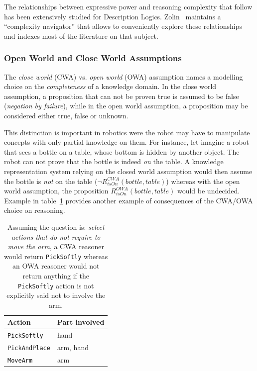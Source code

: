 \documentclass[a4paper, twocolumn]{article}
\begin{document}
The relationships between expressive power and reasoning complexity that follow
has been extensively studied for Description Logics.
Zolin~\cite{ZolinDLComplexityNavigator} maintains a ``complexity navigator''
that allows to conveniently explore these relationships and indexes most of the
literature on that subject.

\subsubsection{Open World and Close World Assumptions}

The \emph{close world} (CWA) vs. \emph{open world} (OWA) assumption names a
modelling choice on the \emph{completeness} of a knowledge domain. In the close
world assumption, a proposition that can not be proven true is assumed to be
false (\emph{negation by failure}), while in the open world assumption, a
proposition may be considered either true, false or unknown.

This distinction is important in robotics were the robot may have to manipulate
concepts with only partial knowledge on them. For instance, let imagine a robot
that sees a bottle on a table, whose bottom is hidden by another object. The
robot can not prove that the bottle is indeed \emph{on} the table. A knowledge
representation system relying on the closed world assumption would then assume
the bottle is \emph{not} on the table ($\lnot R^{CWA}_{isOn}(bottle, table)$)
whereas with the open world assumption, the proposition $R^{OWA}_{isOn}(bottle,
table)$ would be undecided. Example in table~\ref{table|cwa-owa-example} provides
another example of consequences of the CWA/OWA choice on reasoning.

\begin{table}
    \begin{center}
    \begin{tabular}{ll}
    {\bf Action} & {\bf Part involved} \\
    \hline
    {\tt PickSoftly} & hand \\
    {\tt PickAndPlace} & arm, hand \\
    {\tt MoveArm} & arm \\
    \hline
    \end{tabular}
    \end{center}
    \caption{Assuming the question is: \emph{select actions that do not require
    to move the arm}, a CWA reasoner would return {\tt PickSoftly} whereas an
    OWA reasoner would not return anything if the {\tt PickSoftly} action is
    not explicitly said not to involve the arm.}
    \label{table|cwa-owa-example}
\end{table}
\end{document}
